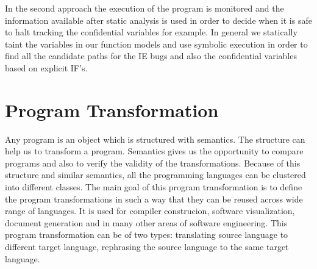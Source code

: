 In the second approach the execution of the program is monitored and 
the information available after static analysis is used in order 
to decide when it is safe  to halt tracking the confidential variables
for example. In general we statically taint the variables in our function models
and use symbolic execution in order to find all the candidate paths 
for the IE bugs and also the confidential variables based on explicit IF's.



\section{Program Transformation}
Any program is an object which is structured with semantics.
The structure can help us to transform a program. Semantics gives
us the opportunity to compare programs and also to verify the validity
of the transformations. Because of this structure and similar 
semantics, all the programming
languages can be clustered into different classes. The main goal 
of this program transformation is to define the 
program transformations in such a way that they can be reused across
wide range of languages. It is used for compiler construcion, software 
visualization, document generation
and in many other areas of software engineering. This program transformation 
can be of two types: translating source language to different target language,
rephrasing the source language to the same target language.
